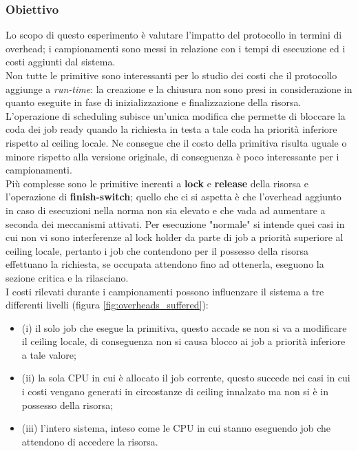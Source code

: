 {\subsubsection{Obiettivo}
\label{sec:overhead_ob}

\noindent Lo scopo di questo esperimento è valutare l'impatto del protocollo in termini di overhead; i campionamenti sono messi in relazione con i tempi di esecuzione ed i costi aggiunti dal sistema.\\

\noindent Non tutte le primitive sono interessanti per lo studio dei costi che il protocollo aggiunge a \textit{run-time}: la creazione e la chiusura non sono presi in considerazione in quanto eseguite in fase di inizializzazione e finalizzazione della risorsa.\\

\noindent L'operazione di scheduling subisce un'unica modifica che permette di bloccare la coda dei job ready quando la richiesta in testa a tale coda ha priorità inferiore rispetto al ceiling locale. Ne consegue che il costo della primitiva risulta uguale o minore rispetto alla versione originale, di conseguenza è poco interessante per i campionamenti.\\

\noindent Più complesse sono le primitive inerenti a \textbf{lock} e \textbf{release} della risorsa e l'operazione di \textbf{finish-switch}; quello che ci si aspetta è che l'overhead aggiunto in caso di esecuzioni nella norma non sia elevato e che vada ad aumentare a seconda dei meccanismi attivati. Per esecuzione "normale" si intende quei casi in cui non vi sono interferenze al lock holder da parte di job a priorità superiore al ceiling locale, pertanto i job che contendono per il possesso della risorsa effettuano la richiesta, se occupata attendono fino ad ottenerla, eseguono la sezione critica e la rilasciano.\\

\noindent I costi rilevati durante i campionamenti possono influenzare il sistema a tre differenti livelli (figura \ref{fig:overheads_suffered}):\\

\begin{itemize}
	\item {\color{red} (i)} il solo job che esegue la primitiva, questo accade se non si va a modificare il ceiling locale, di conseguenza non si causa blocco ai job a priorità inferiore a tale valore;
	\item {\color{red} (ii)} la sola CPU in cui è allocato il job corrente, questo succede nei casi in cui i costi vengano generati in circostanze di ceiling innalzato ma non si è in possesso della risorsa;
	\item {\color{red} (iii)} l'intero sistema, inteso come le CPU in cui stanno eseguendo job che attendono di accedere la risorsa.
\end{itemize}

}
